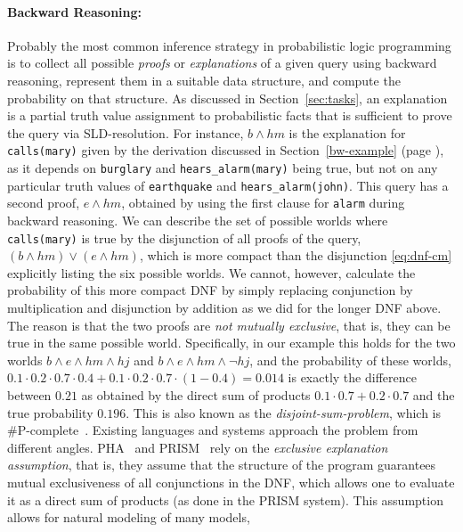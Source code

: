 \documentclass[a4paper]{article}
\begin{document}
\paragraph{Backward Reasoning:} Probably the most common inference strategy in probabilistic logic
programming is to  collect all possible \emph{proofs} or
\emph{explanations} of a given query using backward reasoning,
represent them in a suitable data structure, and compute the
probability on that structure. As discussed in Section~\ref{sec:tasks}, an explanation is a partial
truth value assignment to probabilistic facts that is sufficient to
prove the query via SLD-resolution. For instance, $b\wedge hm$ is the explanation for
\verb|calls(mary)| given by the derivation discussed in Section~\ref{bw-example}
(page \pageref{bw-example}), as it
depends on 
\verb|burglary| and \verb|hears_alarm(mary)| being true, but not on
any particular truth values of \verb|earthquake| and
\verb|hears_alarm(john)|. This query has a second proof, $e\wedge hm$,
obtained by using the first clause for \verb|alarm| during backward
reasoning. We can describe the set of possible worlds where
\verb|calls(mary)| is true by the disjunction of all proofs of the
query, $(b\wedge hm)\vee (e\wedge hm)$, which is more compact than the
disjunction \eqref{eq:dnf-cm} explicitly listing the six possible worlds. We
cannot, however, calculate the probability of this more compact DNF by
simply replacing conjunction by multiplication and disjunction by
addition as we did for the longer DNF above. The reason is that the
two proofs are \emph{not mutually exclusive}, that is, they can be
true in the same possible world. Specifically, in our example this
holds for  the two worlds $b\wedge
e \wedge hm \wedge hj$ and $b\wedge e\wedge hm\wedge\neg
hj$, and the probability
of these worlds, $0.1\cdot 0.2\cdot 0.7\cdot 0.4 + 0.1\cdot 0.2\cdot
0.7\cdot (1-0.4) = 0.014$ is exactly the difference between $0.21$ as
obtained by the direct sum of products $0.1\cdot 0.7+0.2\cdot 0.7$ and the true probability
$0.196$. This is also known as the \emph{disjoint-sum-problem}, which is
\#P-complete~\citep{Valiant79}. Existing languages and systems approach the problem
from different angles. PHA~\citep{Poole92} and
PRISM~\citep{SatoKameya:01} rely on the \emph{exclusive explanation
  assumption}, that is, they assume that the structure of the program guarantees mutual
exclusiveness of all conjunctions in the DNF, which allows one to evaluate it as a
direct sum of products (as done in the PRISM system). This assumption
allows for natural modeling of many models,
\end{document}
